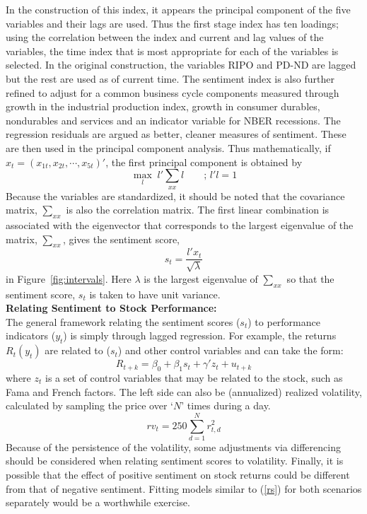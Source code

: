 In the construction of this index, it appears the principal component of the five variables and their lags are used. Thus the first stage index has ten loadings; using the correlation between the index and current and lag values of the variables, the time index that is most appropriate for each of the variables is selected. In the original construction, the variables RIPO and PD-ND are lagged but the rest are used as of current time. The sentiment index is also further refined to adjust for a common business cycle components measured through growth in the industrial production index, growth in consumer durables, nondurables and services and an indicator variable for NBER recessions. The regression residuals are argued as better, cleaner measures of sentiment. These are then used in the principal component analysis. Thus mathematically, if $x_t=(x_{1t},x_{2t},\cdots,x_{5t})'$, the first principal component is obtained by
	\begin{equation}
	\max_l \; l' \textstyle \sum_{xx} l \quad\quad ; \, l'l=1 
	\end{equation}
Because the variables are standardized, it should be noted that the covariance matrix, $\sum_{xx}$ is also the correlation matrix. The first linear combination is associated with the eigenvector that corresponds to the largest eigenvalue of the matrix, $\sum_{xx}$, gives the sentiment score,
	\begin{equation}\label{st}
	s_t= \dfrac{l' x_t}{\sqrt{\lambda}}
	\end{equation}
in Figure~\ref{fig:intervals}. Here $\lambda$ is the largest eigenvalue of $\sum_{xx}$ so that the sentiment score, $s_t$ is taken to have unit variance. \\


\noindent\textbf{Relating Sentiment to Stock Performance:} \\


The general framework relating the sentiment scores ($s_t$) to performance indicators ($y_t$) is simply through lagged regression. For example, the returns $R_t(y_t)$ are related to ($s_t$) and other control variables and can take the form:
	\begin{equation}\label{rs}
	R_{t+k}= \beta_0 + \beta_1 s_t + \gamma' z_t + u_{t+k}
	\end{equation}
where $z_t$ is a set of control variables that may be related to the stock, such as Fama and French factors. The left side can also be (annualized) realized volatility, calculated by sampling the price over `$N$' times during a day. 
	\begin{equation}
	rv_t = 250 \sum_{d=1}^N r_{t,d}^2
	\end{equation}
Because of the persistence of the volatility, some adjustments via differencing should be considered when relating sentiment scores to volatility. Finally, it is possible that the effect of positive sentiment on stock returns could be different from that of negative sentiment. Fitting models similar to (\ref{rs}) for both scenarios separately would be a worthwhile exercise. \\


